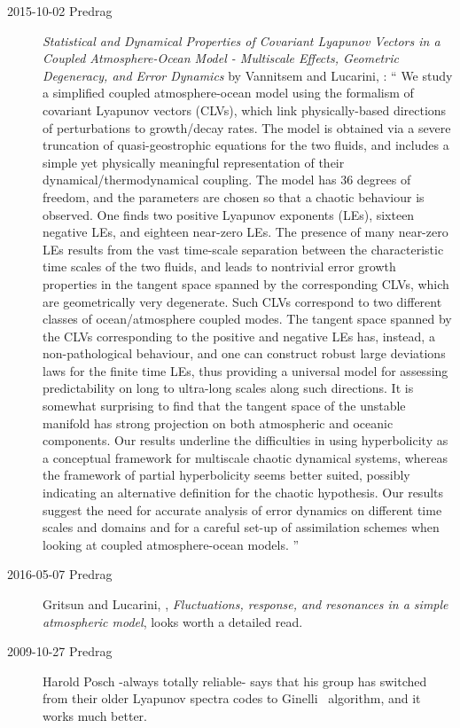 \begin{description}
\item[2015-10-02 Predrag]
\emph{Statistical and Dynamical Properties of Covariant Lyapunov Vectors in a
  Coupled Atmosphere-Ocean Model - Multiscale Effects, Geometric Degeneracy,
  and Error Dynamics}
by Vannitsem and Lucarini,
: ``
We study a simplified coupled atmosphere-ocean model using the formalism of
covariant Lyapunov vectors (CLVs), which link physically-based directions of
perturbations to growth/decay rates. The model is obtained via a severe
truncation of quasi-geostrophic equations for the two fluids, and includes a
simple yet physically meaningful representation of their
dynamical/thermodynamical coupling. The model has 36 degrees of freedom, and
the parameters are chosen so that a chaotic behaviour is observed. One finds
two positive Lyapunov exponents (LEs), sixteen negative LEs, and eighteen
near-zero LEs. The presence of many near-zero LEs results from the vast
time-scale separation between the characteristic time scales of the two fluids,
and leads to nontrivial error growth properties in the tangent space spanned by
the corresponding CLVs, which are geometrically very degenerate. Such CLVs
correspond to two different classes of ocean/atmosphere coupled modes. The
tangent space spanned by the CLVs corresponding to the positive and negative
LEs has, instead, a non-pathological behaviour, and one can construct robust
large deviations laws for the finite time LEs, thus providing a universal model
for assessing predictability on long to ultra-long scales along such
directions. It is somewhat surprising to find that the tangent space of the
unstable manifold has strong projection on both atmospheric and oceanic
components. Our results underline the difficulties in using hyperbolicity as a
conceptual framework for multiscale chaotic dynamical systems, whereas the
framework of partial hyperbolicity seems better suited, possibly indicating an
alternative definition for the chaotic hypothesis. Our results suggest the need
for accurate analysis of error dynamics on different time scales and domains
and for a careful set-up of assimilation schemes when looking at coupled
atmosphere-ocean models.
''

\item[2016-05-07 Predrag]
Gritsun and Lucarini, ,
{\em Fluctuations, response, and resonances in a simple atmospheric model},
looks worth a detailed read.

\item[2009-10-27 Predrag]
Harold Posch -always totally reliable- says that his group
has switched from their older Lyapunov spectra codes to
Ginelli \etal\ algorithm, and it works much better.


\end{description}
